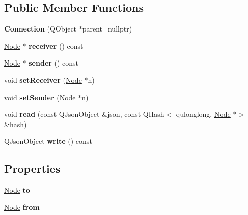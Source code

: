 \subsection*{Public Member Functions}
\begin{DoxyCompactItemize}
\item 
\mbox{\label{classConnection_a8afe63c8ac9873d6e01e2ca19218344e}} 
{\bfseries Connection} (Q\+Object $\ast$parent=nullptr)
\item 
\mbox{\label{classConnection_ab510cb0a3cf64e4d98f624e73728bec0}} 
\mbox{\hyperlink{classNode}{Node}} $\ast$ {\bfseries receiver} () const
\item 
\mbox{\label{classConnection_af28434b67e1e6c6930f5363612dda233}} 
\mbox{\hyperlink{classNode}{Node}} $\ast$ {\bfseries sender} () const
\item 
\mbox{\label{classConnection_ac7e9230266e557439f1597d14d92bd41}} 
void {\bfseries set\+Receiver} (\mbox{\hyperlink{classNode}{Node}} $\ast$n)
\item 
\mbox{\label{classConnection_aab3e0207b72d5af2dfbf6c0757ecc4da}} 
void {\bfseries set\+Sender} (\mbox{\hyperlink{classNode}{Node}} $\ast$n)
\item 
\mbox{\label{classConnection_ad75ed4e7c64886d0a7b1b229da1087a6}} 
void {\bfseries read} (const Q\+Json\+Object \&json, const Q\+Hash$<$ qulonglong, \mbox{\hyperlink{classNode}{Node}} $\ast$$>$ \&hash)
\item 
\mbox{\label{classConnection_a8e141967a494f7e3d577fe018cfa5178}} 
Q\+Json\+Object {\bfseries write} () const
\end{DoxyCompactItemize}
\subsection*{Properties}
\begin{DoxyCompactItemize}
\item 
\mbox{\label{classConnection_a801ac88d7985062c01ebff75ca3845a7}} 
\mbox{\hyperlink{classNode}{Node}} {\bfseries to}
\item 
\mbox{\label{classConnection_a9e0992b9aebf3307aa05ef797ed8426d}} 
\mbox{\hyperlink{classNode}{Node}} {\bfseries from}
\end{DoxyCompactItemize}
